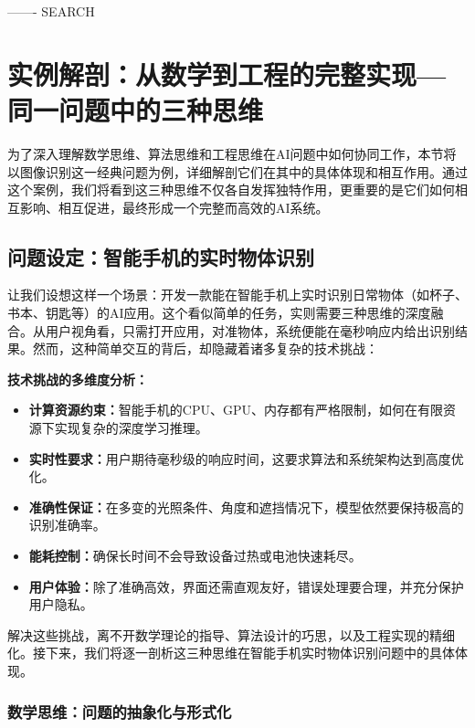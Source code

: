 

------- SEARCH
\section{实例解剖：从数学到工程的完整实现---同一问题中的三种思维}
为了深入理解数学思维、算法思维和工程思维在AI问题中如何协同工作，本节将以图像识别这一经典问题为例，详细解剖它们在其中的具体体现和相互作用。通过这个案例，我们将看到这三种思维不仅各自发挥独特作用，更重要的是它们如何相互影响、相互促进，最终形成一个完整而高效的AI系统。

\subsection{问题设定：智能手机的实时物体识别}
让我们设想这样一个场景：开发一款能在智能手机上实时识别日常物体（如杯子、书本、钥匙等）的AI应用。这个看似简单的任务，实则需要三种思维的深度融合。从用户视角看，只需打开应用，对准物体，系统便能在毫秒响应内给出识别结果。然而，这种简单交互的背后，却隐藏着诸多复杂的技术挑战：

\textbf{技术挑战的多维度分析：}
\begin{itemize}
\item \textbf{计算资源约束：}智能手机的CPU、GPU、内存都有严格限制，如何在有限资源下实现复杂的深度学习推理。
\item \textbf{实时性要求：}用户期待毫秒级的响应时间，这要求算法和系统架构达到高度优化。
\item \textbf{准确性保证：}在多变的光照条件、角度和遮挡情况下，模型依然要保持极高的识别准确率。
\item \textbf{能耗控制：}确保长时间不会导致设备过热或电池快速耗尽。
\item \textbf{用户体验：}除了准确高效，界面还需直观友好，错误处理要合理，并充分保护用户隐私。
\end{itemize}

解决这些挑战，离不开数学理论的指导、算法设计的巧思，以及工程实现的精细化。接下来，我们将逐一剖析这三种思维在智能手机实时物体识别问题中的具体体现。

\subsubsection{数学思维：问题的抽象化与形式化}

